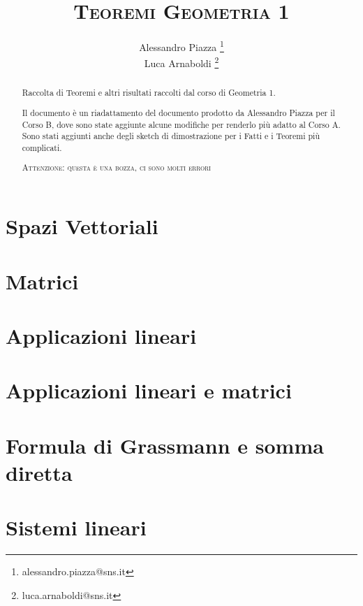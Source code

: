 \documentclass[9pt, a4paper]{article}
\title{\textsc{Teoremi Geometria 1}}
\author{Alessandro Piazza \thanks{alessandro.piazza@sns.it} \\ 
		Luca Arnaboldi \thanks{luca.arnaboldi@sns.it}}
\theoremstyle{mythm}
\begin{document}
\maketitle

\begin{abstract}
	Raccolta di Teoremi e altri risultati raccolti dal corso di Geometria 1.
	
	Il documento è un riadattamento del documento prodotto da Alessandro Piazza per il Corso B, dove sono state aggiunte alcune modifiche per renderlo più adatto al Corso A. 
	Sono stati aggiunti anche degli sketch di dimostrazione per i Fatti e i Teoremi più complicati. 
	\begin{center}
		\textsc{Attenzione: questa è una bozza, ci sono molti errori}
	\end{center}
\end{abstract}

\tableofcontents

\clearpage

\section{Spazi Vettoriali}


\clearpage

\section{Matrici}


\clearpage

\section{Applicazioni lineari}


\clearpage

\section{Applicazioni lineari e matrici}


\clearpage

\section{Formula di Grassmann e somma diretta}


\clearpage

\section{Sistemi lineari}

\end{document}
